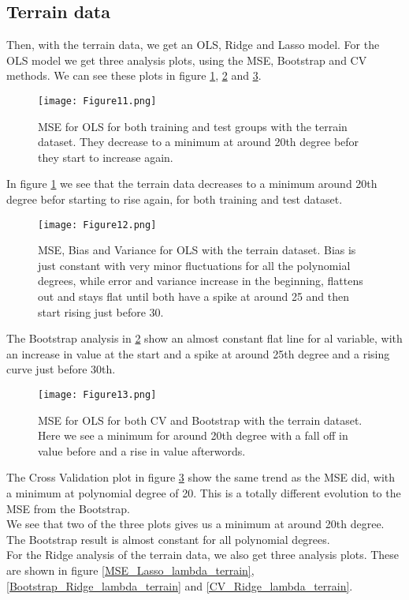 \documentclass[11pt, A4paper, english]{article}
\begin{document}
\begin{multicols}{2}
			\subsection{Terrain data}
Then, with the terrain data, we get an OLS, Ridge and Lasso model. For the OLS model we get three analysis plots, using the MSE, Bootstrap and CV methods. We can see these plots in figure \ref{MSE_OLS_terrain}, \ref{Bootstrap_OLS terrain} and \ref{CV_OLS_terrain}.
			\begin{figure}[H]
\texttt{[image: Figure11.png]}
\caption{MSE for OLS for both training and test groups with the terrain dataset. They decrease to a minimum at around 20th degree befor they start to increase again.}
\label{MSE_OLS_terrain}
			\end{figure}
In figure \ref{MSE_OLS_terrain} we see that the terrain data decreases to a minimum around 20th degree befor starting to rise again, for both training and test dataset.
			\begin{figure}[H]
\texttt{[image: Figure12.png]}
\caption{MSE, Bias and Variance for OLS with the terrain dataset. Bias is just constant with very minor fluctuations for all the polynomial degrees, while error and variance increase in the beginning, flattens out and stays flat until both have a spike at around 25 and then start rising just before 30.}
\label{Bootstrap_OLS terrain}
			\end{figure}
The Bootstrap analysis in \ref{Bootstrap_OLS terrain} show an almost constant flat line for al variable, with an increase in value at the start and a spike at around 25th degree and a rising curve just before 30th.
			\begin{figure}[H]
\texttt{[image: Figure13.png]}
\caption{MSE for OLS for both CV and Bootstrap with the terrain dataset. Here we see a minimum for around 20th degree with a fall off in value before and a rise in value afterwords.}
\label{CV_OLS_terrain}
			\end{figure}
The Cross Validation plot in figure \ref{CV_OLS_terrain} show the same trend as the MSE did, with a minimum at polynomial degree of 20. This is a totally different evolution to the MSE from the Bootstrap. \\
We see that two of the three plots gives us a minimum at around 20th degree. The Bootstrap result is almost constant for all polynomial degrees. \\
For the Ridge analysis of the terrain data, we also get three analysis plots. These are shown in figure \ref{MSE_Lasso_lambda_terrain}, \ref{Bootstrap_Ridge_lambda_terrain} and \ref{CV_Ridge_lambda_terrain}.

\end{multicols}
\end{document}
